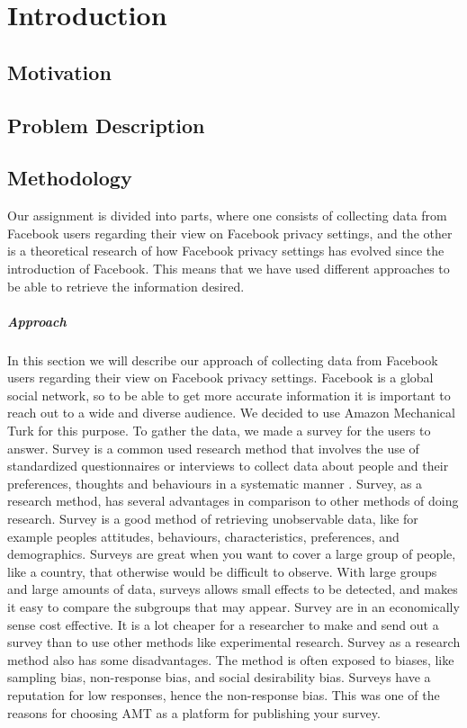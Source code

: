 \chapter{Introduction}
\label{chp:introduction} 

\section{Motivation}

\section{Problem Description}

\section{Methodology}
Our assignment is divided into parts, where one consists of collecting data from Facebook users regarding their view on Facebook privacy settings, and the other is a theoretical research of how Facebook privacy settings has evolved since the introduction of Facebook. This means that we have used different approaches to be able to retrieve the information desired.

\paragraph{Approach}
In this section we will describe our approach of collecting data from Facebook users regarding their view on Facebook privacy settings. Facebook is a global social network, so to be able to get more accurate information it is important to reach out to a wide and diverse audience. We decided to use Amazon Mechanical Turk for this purpose. To gather the data, we made a survey for the users to answer. Survey is a common used research method that involves the use of standardized questionnaires or interviews to collect data about people and their preferences, thoughts and behaviours in a systematic manner \cite{survey}. Survey, as a research method, has several advantages in comparison to other methods of doing research. Survey is a good method of retrieving unobservable data, like for example peoples attitudes, behaviours, characteristics, preferences, and demographics. Surveys are great when you want to cover a large group of people, like a country, that otherwise would be difficult to observe. With large groups and large amounts of data, surveys allows small effects to be detected, and makes it easy to compare the subgroups that may appear. Survey are in an economically sense cost effective. It is a lot cheaper for a researcher to make and send out a survey than to use other methods like experimental research. Survey as a research method also has some disadvantages. The method is often exposed to biases, like sampling bias, non-response bias, and social desirability bias. Surveys have a reputation for low responses, hence the non-response bias. This was one of the reasons for choosing AMT as a platform for publishing your survey. 

